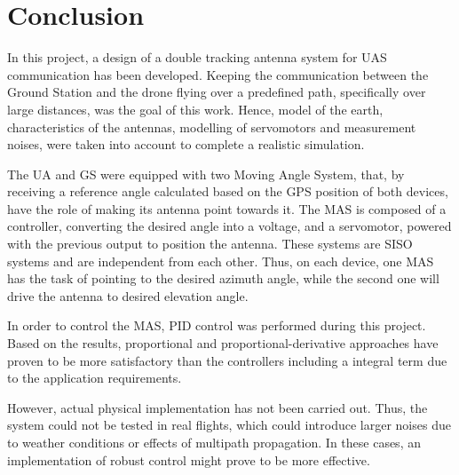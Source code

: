 \chapter{Conclusion}\label{ch:conclusion}


In this project, a design of a double tracking antenna system for UAS communication has been developed. Keeping the communication between the Ground Station and the drone flying over a predefined path, specifically over large distances, was the goal of this work. Hence, model of the earth, characteristics of the antennas, modelling of servomotors and measurement noises, were taken into account to complete a realistic simulation.

The UA and GS were equipped with two Moving Angle System, that, by receiving a reference angle calculated based on the GPS position of both devices, have the role of making its antenna point towards it. The MAS is composed of a controller, converting the desired angle into a voltage, and a servomotor, powered with the previous output to position the antenna. These systems are SISO systems and are independent from each other. Thus, on each device, one MAS has the task of pointing to the desired azimuth angle, while the second one will drive the antenna to desired elevation angle.

In order to control the MAS, PID control was performed during this project. Based on the results, proportional and proportional-derivative approaches have proven to be more satisfactory than the controllers including a integral term due to the application requirements.



However, actual physical implementation has not been carried out. Thus, the system could not be tested in real flights, which could introduce larger noises due to weather conditions or effects of multipath propagation. In these cases, an implementation of robust control might prove to be more effective.


